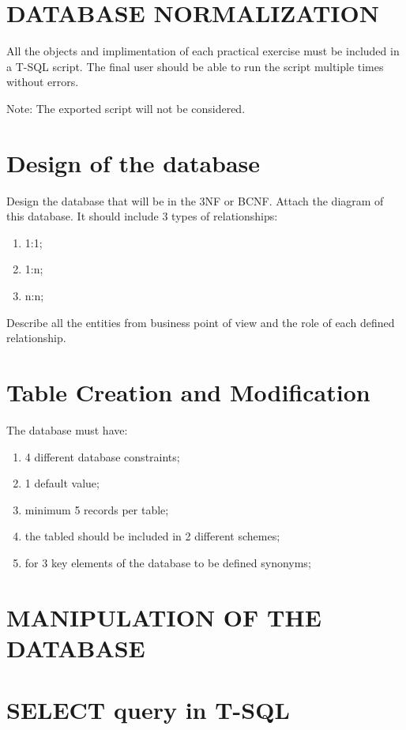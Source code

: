 \section*{DATABASE NORMALIZATION}

All the objects and implimentation of each practical exercise must be included in a T-SQL script.
The final user should be able to run the script multiple times without errors. 

Note: The exported script will not be considered.

\section{Design of the database}

Design the database that will be in the 3NF or BCNF. Attach the diagram of this database. It should include 3 types of relationships:


\begin{enumerate}[itemsep=2pt]
\item 1:1;
\item 1:n;
\item n:n;
\end{enumerate}

Describe all the entities from business point of view and the role of each defined relationship.

\section{Table Creation and Modification}

The database must have:
\begin{enumerate}[itemsep=2pt]
\item 4 different database constraints;
\item 1 default value;
\item minimum 5 records per table;
\item the tabled should be included in 2 different schemes;
\item for 3 key elements of the database to be defined synonyms;
\end{enumerate}

\section*{MANIPULATION OF THE DATABASE}

\section{SELECT query in T-SQL}\label{sec:select}

